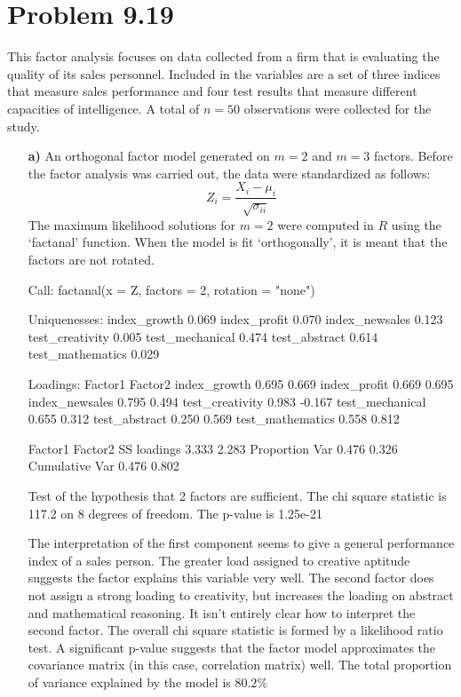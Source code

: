 


\maketitle

\section*{Problem 9.19} 
This factor analysis focuses on data collected from a firm that is evaluating the quality of its sales personnel. Included in the variables are a set of three indices that measure sales performance and four test results that measure different capacities of intelligence. A total of $n=50$ observations were collected for the study.

\begin{enumerate}
\item[\bf{a)}]
	An orthogonal factor model generated on $m=2$ and $m=3$ factors. Before the factor analysis was carried out, the data were standardized as follows: $$Z_i = \frac{X_i - \mu_i}{\sqrt{\sigma_{ii}}}$$ The maximum likelihood solutions for $m=2$ were computed in $R$ using the `factanal' function. When the model is fit `orthogonally', it is meant that the factors are not rotated.

\begin{rc}

Call:
factanal(x = Z, factors = 2, rotation = "none")

Uniquenesses:
index_growth     0.069
index_profit     0.070	
index_newsales	 0.123
test_creativity  0.005 
test_mechanical  0.474	
test_abstract	   0.614	
test_mathematics 0.029 

Loadings:
                Factor1 Factor2
index_growth      0.695   0.669 
index_profit      0.669   0.695 
index_newsales    0.795   0.494 
test_creativity   0.983  -0.167 
test_mechanical   0.655   0.312 
test_abstract     0.250   0.569 
test_mathematics  0.558   0.812 

                Factor1 Factor2
SS loadings      3.333   2.283
Proportion Var   0.476   0.326
Cumulative Var   0.476   0.802

Test of the hypothesis that 2 factors are sufficient.
The chi square statistic is 117.2 on 8 degrees of freedom.
The p-value is 1.25e-21 

\end{rc}

	The interpretation of the first component seems to give a general performance index of a sales person. The greater load assigned to creative aptitude suggests the factor explains this variable very well. The second factor does not assign a strong loading to creativity, but increases the loading on abstract and mathematical reasoning. It isn't entirely clear how to interpret the second factor. The overall chi square statistic is formed by a likelihood ratio test. A significant p-value suggests that the factor model approximates the covariance matrix (in this case, correlation matrix) well. The total proportion of variance explained by the model is $80.2\%$


\end{enumerate}

